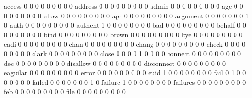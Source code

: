 \documentclass[compress,8pt]{beamer}
\begin{document}
\begin{frame}
\begin{Schunk}
  access                                     0   0   0   0   0   0   0   0   0
  address                                    0   0   0   0   0   0   0   0   0
  admin                                      0   0   0   0   0   0   0   0   0
  age                                        0   0   0   0   0   0   0   0   0
  allow                                      0   0   0   0   0   0   0   0   0
  apr                                        0   0   0   0   0   0   0   0   0
  argument                                   0   0   0   0   0   0   0   1   0
  auth                                       0   0   0   0   0   0   0   0   0
  authent                                    1   0   0   0   0   0   0   0   0
  bad                                        0   0   0   0   0   0   0   0   0
  behalf                                     0   0   0   0   0   0   0   0   0
  bind                                       0   0   0   0   0   0   0   0   0
  brown                                      0   0   0   0   0   0   0   0   0
  bye                                        0   0   0   0   0   0   0   0   0
  cadi                                       0   0   0   0   0   0   0   0   0
  chan                                       0   0   0   0   0   0   0   0   0
  chang                                      0   0   0   0   0   0   0   0   0
  check                                      0   0   0   0   0   0   0   0   0
  clark                                      0   0   0   0   0   0   0   0   0
  close                                      0   0   0   0   1   0   0   0   0
  connect                                    0   0   0   0   0   0   0   0   0
  dec                                        0   0   0   0   0   0   0   0   0
  disallow                                   0   0   0   0   0   0   0   0   0
  disconnect                                 0   0   0   0   0   0   0   0   0
  eaguilar                                   0   0   0   0   0   0   0   0   0
  error                                      0   0   0   0   0   0   0   0   0
  euid                                       1   0   0   0   0   0   0   0   0
  fail                                       0   1   0   0   0   0   0   0   0
  failed                                     0   0   0   0   0   0   0   1   0
  failure                                    1   0   0   0   0   0   0   0   0
  failures                                   0   0   0   0   0   0   0   0   0
  feb                                        0   0   0   0   0   0   0   0   0
  file                                       0   0   0   0   0   0   0   0   0

\end{Schunk}
\end{frame}
\end{document}
